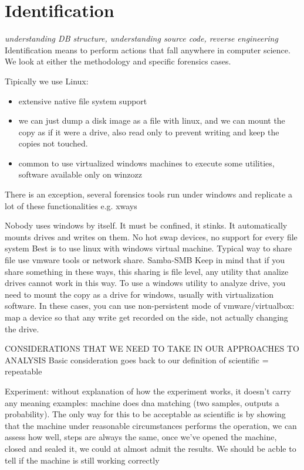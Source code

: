 \chapter{Identification}
    \textit{understanding DB structure, understanding source code, reverse engineering}
    Identification means to perform actions that fall anywhere in computer science.
    We look at either the methodology and specific forensics cases.

    Tipically we use Linux:
    \begin{itemize}
        \item extensive native file system support
        \item we can just dump a disk image as a file with linux, and we can mount the copy as if it were a drive, also read only to prevent writing and keep the copies not touched.
        \item common to use virtualized windows machines to execute some utilities, software available only on winzozz
    \end{itemize}
    There is an exception, several forensics tools run under windows and replicate a lot of these functionalities e.g. xways 

    Nobody uses windows by itself. It must be confined, it stinks.
    It automatically mounts drives and writes on them.
    No hot swap devices, no support for every file system
    Best is to use linux with windows virtual machine.
    Typical way to share file use vmware tools or network share.
    Samba-SMB 
    Keep in mind that if you share something in these ways, this sharing is file level, any utility that analize drives cannot work in this way.
    To use a windows utility to analyze drive, you need to mount the copy as a drive for windows, usually with virtualization software.
    In these cases, you can use non-persistent mode of vmware/virtualbox: map a device so that any write get recorded on the side, not actually changing the drive.

    CONSIDERATIONS THAT WE NEED TO TAKE IN OUR APPROACHES TO ANALYSIS 
        Basic consideration goes back to our definition of scientific = repeatable 

        Experiment: without explanation of how the experiment works, it doesn't carry any meaning 
                    examples: machine does dna matching (two samples, outputs a probability). The only way for this to be acceptable as scientific is by showing that the machine under reasonable circumstances performs the operation, we can assess how well, steps are always the same, once we've opened the machine, closed and sealed it, we could at almost admit the results. We should be acble to tell if the machine is still working correctly 
        
